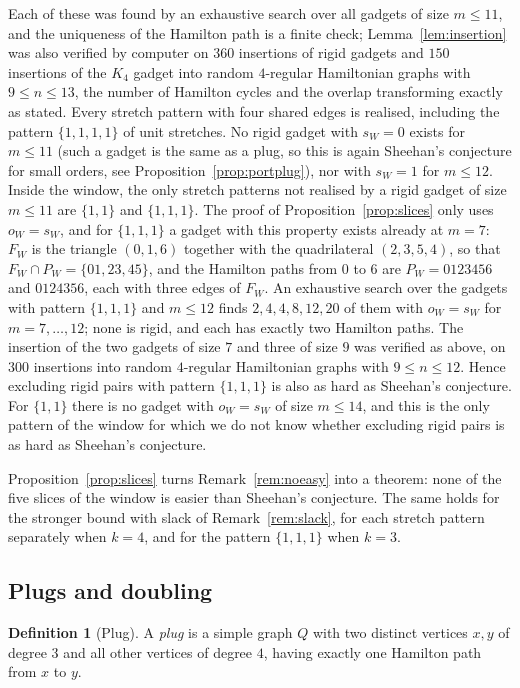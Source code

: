 \documentclass[11pt,a4paper]{article}
\theoremstyle{definition}
\newtheorem{definition}[theorem]{Definition}
\theoremstyle{remark}
\begin{document}
Each of these was found by an exhaustive search over all gadgets of size $m\le11$, and the uniqueness of the Hamilton path is a finite check; Lemma~\ref{lem:insertion} was also verified by computer on $360$ insertions of rigid gadgets and $150$ insertions of the $K_4$ gadget into random $4$-regular Hamiltonian graphs with $9\le n\le13$, the number of Hamilton cycles and the overlap transforming exactly as stated. Every stretch pattern with four shared edges is realised, including the pattern $\{1,1,1,1\}$ of unit stretches. No rigid gadget with $s_W=0$ exists for $m\le11$ (such a gadget is the same as a plug, so this is again Sheehan's conjecture for small orders, see Proposition~\ref{prop:portplug}), nor with $s_W=1$ for $m\le12$. Inside the window, the only stretch patterns not realised by a rigid gadget of size $m\le11$ are $\{1,1\}$ and $\{1,1,1\}$. The proof of Proposition~\ref{prop:slices} only uses $o_W=s_W$, and for $\{1,1,1\}$ a gadget with this property exists already at $m=7$: $F_W$ is the triangle $(0,1,6)$ together with the quadrilateral $(2,3,5,4)$, so that $F_W\cap P_W=\{01,23,45\}$, and the Hamilton paths from $0$ to $6$ are $P_W=0123456$ and $0124356$, each with three edges of $F_W$. An exhaustive search over the gadgets with pattern $\{1,1,1\}$ and $m\le12$ finds $2,4,4,8,12,20$ of them with $o_W=s_W$ for $m=7,\dots,12$; none is rigid, and each has exactly two Hamilton paths. The insertion of the two gadgets of size $7$ and three of size $9$ was verified as above, on $300$ insertions into random $4$-regular Hamiltonian graphs with $9\le n\le12$. Hence excluding rigid pairs with pattern $\{1,1,1\}$ is also as hard as Sheehan's conjecture. For $\{1,1\}$ there is no gadget with $o_W=s_W$ of size $m\le14$, and this is the only pattern of the window for which we do not know whether excluding rigid pairs is as hard as Sheehan's conjecture.

Proposition~\ref{prop:slices} turns Remark~\ref{rem:noeasy} into a theorem: none of the five slices of the window is easier than Sheehan's conjecture. The same holds for the stronger bound with slack of Remark~\ref{rem:slack}, for each stretch pattern separately when $k=4$, and for the pattern $\{1,1,1\}$ when $k=3$.

\subsection{Plugs and doubling}

\begin{definition}[Plug]\label{def:plug}
A \emph{plug} is a simple graph $Q$ with two distinct vertices $x,y$ of degree $3$ and all other vertices of degree $4$, having exactly one Hamilton path from $x$ to $y$.
\end{definition}
\end{document}
